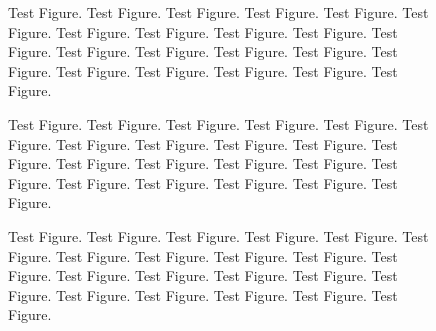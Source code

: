 \lipsum[2]

\lipsum[2]

\begin{figure}[th]
\begin{center}
\end{center}

\caption{Test Figure. Test Figure. Test Figure. Test Figure. Test Figure. Test
Figure. Test Figure. Test Figure. Test Figure. Test Figure. Test Figure.
Test Figure. Test Figure. Test Figure. Test Figure. Test Figure. Test
Figure. Test Figure. Test Figure. Test Figure. Test Figure.}
\end{figure}


\lipsum[2]

\lipsum[2]

\begin{figure}[th]
\begin{center}
\end{center}

\caption{Test Figure. Test Figure. Test Figure. Test Figure. Test Figure. Test
Figure. Test Figure. Test Figure. Test Figure. Test Figure. Test Figure.
Test Figure. Test Figure. Test Figure. Test Figure. Test Figure. Test
Figure. Test Figure. Test Figure. Test Figure. Test Figure.}
\end{figure}


\lipsum[2]

\begin{figure}[th]
\begin{center}
\end{center}

\caption{Test Figure. Test Figure. Test Figure. Test Figure. Test Figure. Test
Figure. Test Figure. Test Figure. Test Figure. Test Figure. Test Figure.
Test Figure. Test Figure. Test Figure. Test Figure. Test Figure. Test
Figure. Test Figure. Test Figure. Test Figure. Test Figure.}
\end{figure}


\lipsum[2]


